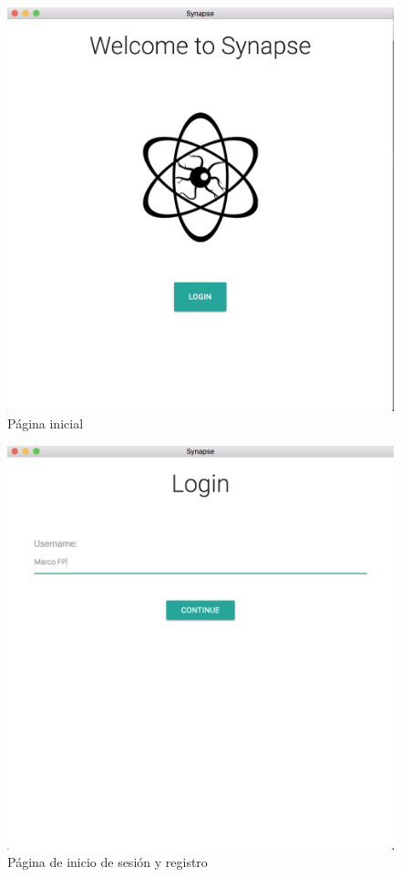 \begin{figure}[H]
	\centering
	\includegraphics[width=\textwidth]{imagenes/desktop-landing-page}
	\caption{Página inicial}
	\label{fig:desktop-landing-page}
\end{figure}

\begin{figure}[H]
	\centering
	\includegraphics[width=\textwidth]{imagenes/desktop-login-page}
	\caption{Página de inicio de sesión y registro}
	\label{fig:desktop-login}
\end{figure}

